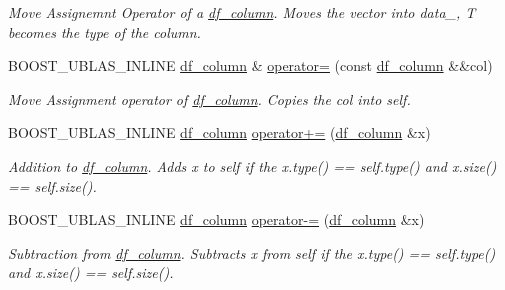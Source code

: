 \begin{DoxyCompactItemize}
\begin{DoxyCompactList}\small\item\em Move Assignemnt Operator of a \hyperlink{classboost_1_1numeric_1_1ublas_1_1df__column}{df\+\_\+column}. Moves the vector into data\+\_\+, T becomes the type of the column. \end{DoxyCompactList}\item 
B\+O\+O\+S\+T\+\_\+\+U\+B\+L\+A\+S\+\_\+\+I\+N\+L\+I\+NE \hyperlink{classboost_1_1numeric_1_1ublas_1_1df__column}{df\+\_\+column} \& \hyperlink{classboost_1_1numeric_1_1ublas_1_1df__column_a46f9ea692ed3919c15907657c288912e}{operator=} (const \hyperlink{classboost_1_1numeric_1_1ublas_1_1df__column}{df\+\_\+column} \&\&col)
\begin{DoxyCompactList}\small\item\em Move Assignment operator of \hyperlink{classboost_1_1numeric_1_1ublas_1_1df__column}{df\+\_\+column}. Copies the col into self. \end{DoxyCompactList}\item 
B\+O\+O\+S\+T\+\_\+\+U\+B\+L\+A\+S\+\_\+\+I\+N\+L\+I\+NE \hyperlink{classboost_1_1numeric_1_1ublas_1_1df__column}{df\+\_\+column} \hyperlink{classboost_1_1numeric_1_1ublas_1_1df__column_a9b4abff0df34cccfc24a31b8e35316d8}{operator+=} (\hyperlink{classboost_1_1numeric_1_1ublas_1_1df__column}{df\+\_\+column} \&x)
\begin{DoxyCompactList}\small\item\em Addition to \hyperlink{classboost_1_1numeric_1_1ublas_1_1df__column}{df\+\_\+column}. Adds x to self if the {\ttfamily x.\+type()} == {\ttfamily self.\+type()} and {\ttfamily x.\+size()} == {\ttfamily self.\+size()}. \end{DoxyCompactList}\item 
B\+O\+O\+S\+T\+\_\+\+U\+B\+L\+A\+S\+\_\+\+I\+N\+L\+I\+NE \hyperlink{classboost_1_1numeric_1_1ublas_1_1df__column}{df\+\_\+column} \hyperlink{classboost_1_1numeric_1_1ublas_1_1df__column_a82e5f8c9b83b0ecd015cb75673b008df}{operator-\/=} (\hyperlink{classboost_1_1numeric_1_1ublas_1_1df__column}{df\+\_\+column} \&x)
\begin{DoxyCompactList}\small\item\em Subtraction from \hyperlink{classboost_1_1numeric_1_1ublas_1_1df__column}{df\+\_\+column}. Subtracts x from self if the {\ttfamily x.\+type()} == {\ttfamily self.\+type()} and {\ttfamily x.\+size()} == {\ttfamily self.\+size()}. \end{DoxyCompactList}\item 

\end{DoxyCompactItemize}
